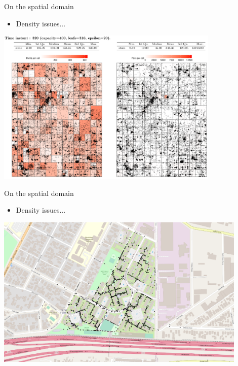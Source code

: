 \documentclass{beamer}
\begin{document}
    \begin{frame}{On the spatial domain}
        \begin{itemize} \item Density issues... \end{itemize} \vspace{0.5cm}

        \centering
        \includegraphics[width=0.8\textwidth]{figures/density.png}
    \end{frame}

    \begin{frame}{On the spatial domain}
        \begin{itemize} \item Density issues... \end{itemize} \vspace{0.5cm}

        \centering
        \includegraphics[width=0.9\textwidth]{figures/LA_T320_N50K_dense.png}
    \end{frame}
\end{document}
